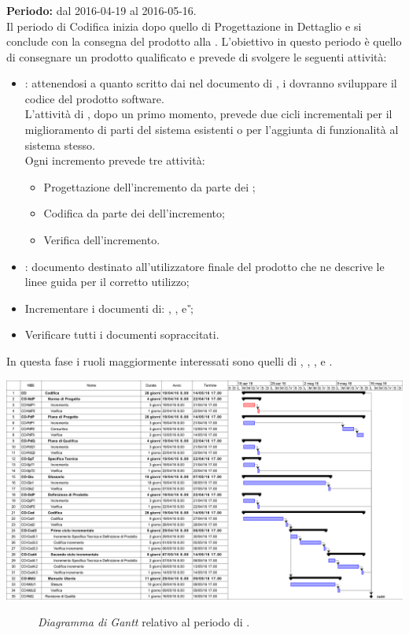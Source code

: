 \subsubsection{\CO}
\textbf{Periodo:} dal 2016-04-19 al 2016-05-16. \\
Il periodo di Codifica inizia dopo quello di Progettazione in Dettaglio e si conclude con la consegna del prodotto alla \RQ. L'obiettivo in questo periodo è quello di consegnare un prodotto qualificato e prevede di svolgere le seguenti attività:
\begin{itemize}
	\item \textbf{\CO}: attenendosi a quanto scritto dai \textit{\Progs} nel documento di \textit{\DDP}, i \textit{\Progrs} dovranno sviluppare il codice del prodotto software.\\
	L'attività di \CO, dopo un primo momento, prevede due cicli incrementali per il miglioramento di parti del sistema esistenti o per l'aggiunta di funzionalità al sistema stesso. \\
	Ogni incremento prevede tre attività:
	\begin{itemize}
		\item Progettazione dell'incremento da parte dei \textit{\Progs};  
		\item Codifica da parte dei \textit{\Progrs} dell'incremento;
		\item Verifica dell'incremento. 
	\end{itemize}
	\item \textit{\MU}: documento destinato all'utilizzatore finale del prodotto che ne descrive le linee guida per il corretto utilizzo;
	\item Incrementare i documenti di: \textit{\NdP}, \textit{\PdP}, \textit{\PdQ} e \textit{\G};
	\item Verificare tutti i documenti sopraccitati.
\end{itemize}
In questa fase i ruoli maggiormente interessati sono quelli di \textit{\Amm}, \textit{\Res}, \textit{\Prog}, \textit{\Progr} e \textit{\Ver}. 
\begin{center}
	\includegraphics[keepaspectratio = true, width=16cm]{immagini/PdP_CodificaGantt.png}
\end{center}
\begin{figure}[h]
	\caption{\textit{Diagramma di Gantt} relativo al periodo di \CO.}\label{etichetta}
\end{figure}

